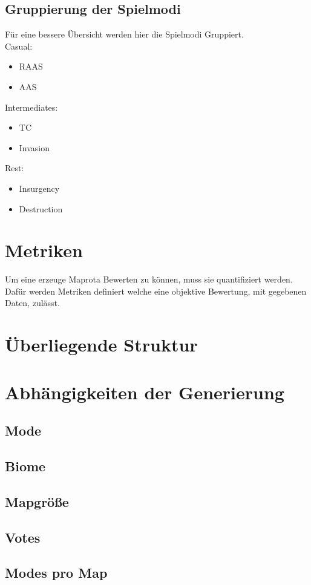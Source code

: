 \documentclass[a4paper, 11pt]{scrartcl}
\begin{document}
        \subsection{Gruppierung der Spielmodi}
                Für eine bessere Übersicht werden hier die Spielmodi Gruppiert.\\
                Casual:
                \begin{itemize}
                    \item RAAS
                    \item AAS
                \end{itemize}
                Intermediates:
                \begin{itemize}
                    \item TC
                    \item Invasion
                \end{itemize}
                Rest:
                \begin{itemize}
                    \item Insurgency
                    \item Destruction 
                \end{itemize}
    
    \section{Metriken}
    Um eine erzeuge Maprota Bewerten zu können, muss sie quantifiziert werden. 
    Dafür werden Metriken definiert welche eine objektive Bewertung, mit gegebenen Daten, zulässt.    



    \section{Überliegende Struktur}
    \section{Abhängigkeiten der Generierung}
    \subsection{Mode}
    \subsection{Biome}
    \subsection{Mapgröße}
    \subsection{Votes}
    \subsection{Modes pro Map}

    \newpage

    \printbibliography[title=Literaturverzeichnis]
\end{document}
